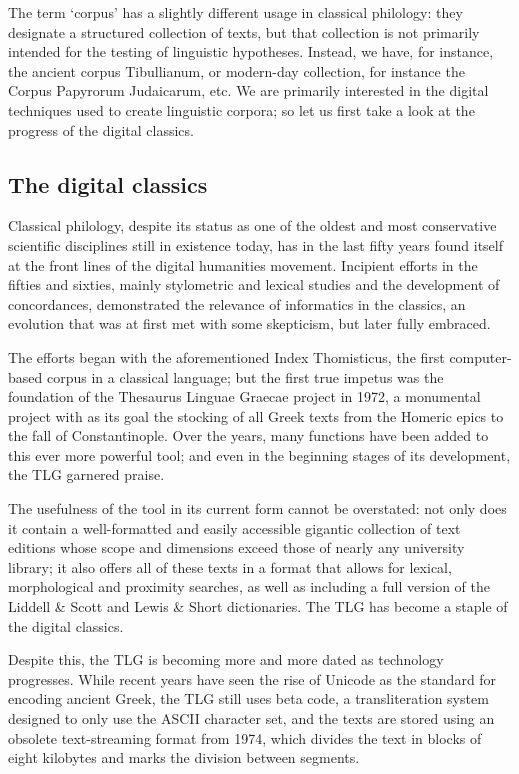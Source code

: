 The term `corpus' has a slightly different usage in classical philology: they
designate a structured collection of texts, but that collection is not
primarily intended for the testing of linguistic hypotheses. Instead, we have,
for instance, the ancient corpus Tibullianum, or modern-day collection, for
  instance the Corpus Papyrorum Judaicarum, etc. We are primarily interested in
  the digital techniques used to create linguistic corpora; so let us first
  take a look at the progress of the digital classics.


\subsection{The digital classics} 

Classical philology, despite its status as one of the oldest and most
conservative scientific disciplines still in existence today, has in the last
fifty years found itself at the front lines of the digital humanities movement.
Incipient efforts in the fifties and sixties, mainly stylometric and lexical
studies and  the development of concordances, demonstrated the relevance of
informatics in the classics, an evolution that was at first met with some
skepticism, but later fully embraced.

The efforts began with the aforementioned Index Thomisticus, the first
computer-based corpus in a classical language; but the first true impetus was
the foundation of the Thesaurus Linguae Graecae project in 1972, a monumental
project with as its goal the stocking of all Greek texts from the Homeric epics
to the fall of Constantinople. Over the years, many functions have been added
to this ever more powerful tool; and even in the beginning stages of its
development, the TLG garnered praise.

The usefulness of the tool in its current form cannot be overstated: not only
does it contain a well-formatted and easily accessible gigantic collection of
text editions whose scope and dimensions exceed those of nearly any university
library; it also offers all of these texts in a format that allows for lexical,
morphological and proximity searches, as well as including a full version of
the Liddell \& Scott and Lewis \& Short dictionaries. The TLG has become a
staple of the digital classics.

Despite this, the TLG is becoming more and more dated as technology progresses.
While recent years have seen the rise of Unicode as the standard for encoding
ancient Greek, the TLG still uses beta code, a transliteration system designed
to only use the ASCII character set, and the texts are stored using an obsolete
text-streaming format from 1974, which divides the text in blocks of eight
kilobytes and marks the division between segments.


